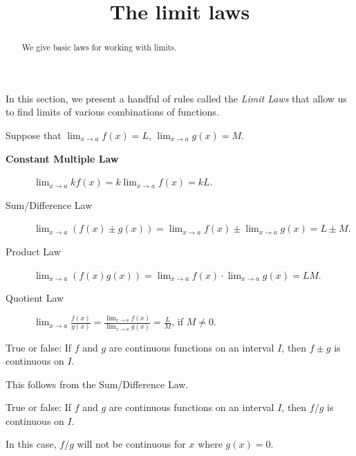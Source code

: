 \documentclass{ximera}
\title[Dig-In:]{The limit laws}
\begin{document}
\begin{abstract}
We give basic laws for working with limits. 
\end{abstract}
\maketitle

In this section, we present a handful of rules called the \textit{Limit Laws}
that allow us to find limits of various combinations of functions.

\begin{theorem}\label{theorem:limit-laws}
Suppose that $\displaystyle\lim_{x\to a}f(x)=L$, $\displaystyle\lim_{x\to a}g(x)=M$.
\begin{description}
\item[\textbf{Constant Multiple Law}] $\displaystyle\lim_{x\to a} kf(x) = k\displaystyle\lim_{x\to a}f(x)=kL$.
\item[Sum/Difference Law] $\displaystyle\lim_{x\to a} (f(x) \pm g(x)) =
  \lim_{x\to a}f(x) \pm \lim_{x\to a}g(x)=L \pm M$.
\item[Product Law]  $\displaystyle\lim_{x\to a} (f(x)g(x)) = \displaystyle\lim_{x\to
  a}f(x)\cdot\lim_{x\to a}g(x)=LM$.
\item[Quotient Law]  $\displaystyle\lim_{x\to a} \frac{f(x)}{g(x)} =
  \frac{\displaystyle\lim_{x\to a}f(x)}{\displaystyle\lim_{x\to a}g(x)}=\frac{L}{M}$, if
  $M\ne0$.
\end{description}
\label{thm:limit laws}
\end{theorem}

\begin{question}
  True or false: If $f$ and $g$ are continuous functions on an
  interval $I$, then $f\pm g$ is continuous on $I$.
  \begin{multipleChoice}
  \end{multipleChoice}
  \begin{feedback}
    This follows from the Sum/Difference Law.
  \end{feedback}
\end{question}

\begin{question}
  True or false: If $f$ and $g$ are continuous functions on an
  interval $I$, then $f/g$ is continuous on $I$.
  \begin{multipleChoice}
  \end{multipleChoice}
  \begin{feedback}
    In this case, $f/g$ will not be continuous for $x$ where $g(x) =
    0$.
  \end{feedback}
\end{question}
\end{document}
